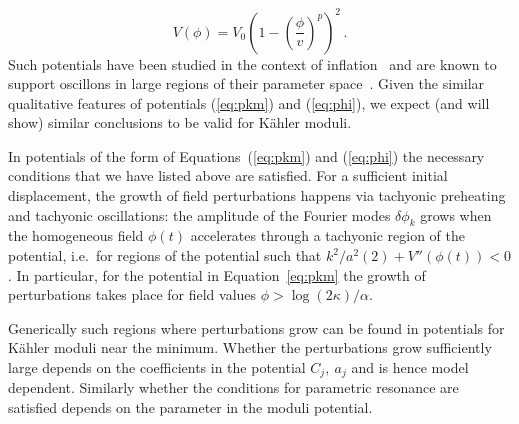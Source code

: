 \documentclass[12pt]{article}
\begin{document}
\begin{equation}
V(\phi)=V_0\left(1-\left(\frac{\phi}{v}\right)^p\right)^2\,.
\label{eq:phi}
\end{equation} 
Such potentials have been studied in the context of inflation~\cite{Linde:1981mu,Izawa:1996dv,Izawa:1997df,Senoguz:2004ky,Boubekeur:2005zm} and are known to support oscillons in large regions of their parameter space~\cite{Antusch:2015nla,Antusch:2015vna,Antusch:2015ziz,Antusch:2016con}. Given the similar qualitative features of potentials (\ref{eq:pkm}) and (\ref{eq:phi}), we expect (and will show) similar conclusions to be valid for K\"ahler moduli. 

In potentials of the form of Equations~(\ref{eq:pkm}) and (\ref{eq:phi}) the necessary conditions that we have listed above are satisfied. For a sufficient initial displacement, the growth of field perturbations happens via tachyonic preheating and tachyonic oscillations: the amplitude of the Fourier modes $\delta \phi_k$ grows when the homogeneous field $\phi(t)$ accelerates through a tachyonic region of the potential, i.e.~for regions of the potential such that $k^2/a^2(2) + V''(\phi(t)) < 0$. In particular, for the potential in Equation~\eqref{eq:pkm} the growth of perturbations takes place for field values $\phi > \log(2 \kappa)/\alpha$.

Generically such regions where perturbations grow can be found in potentials for K\"ahler moduli near the minimum. Whether the perturbations grow sufficiently large depends on the coefficients in the potential $C_j,~a_j$ and is hence model dependent. Similarly whether the conditions for parametric resonance are satisfied depends on the parameter in the moduli potential.
\end{document}
